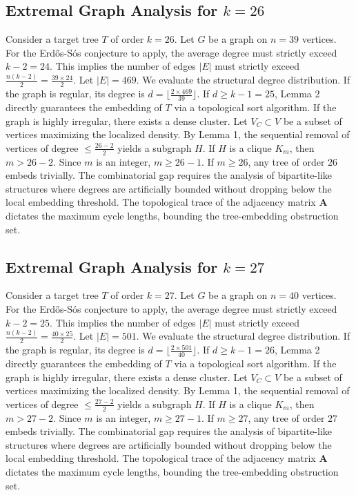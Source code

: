 \documentclass[11pt,a4paper]{article}
\begin{document}
\subsection{Extremal Graph Analysis for $k=26$}
Consider a target tree $T$ of order $k=26$.
Let $G$ be a graph on $n=39$ vertices.
For the Erd\H{o}s-S\'os conjecture to apply, the average degree must strictly exceed $k-2 = 24$.
This implies the number of edges $|E|$ must strictly exceed $\frac{n(k-2)}{2} = \frac{39 \times 24}{2}$.
Let $|E| = 469$.
We evaluate the structural degree distribution. If the graph is regular, its degree is $d = \lfloor \frac{2 \times 469}{39} \rfloor$.
If $d \geq k-1 = 25$, Lemma 2 directly guarantees the embedding of $T$ via a topological sort algorithm.
If the graph is highly irregular, there exists a dense cluster. Let $V_C \subset V$ be a subset of vertices maximizing the localized density.
By Lemma 1, the sequential removal of vertices of degree $\leq \frac{26-2}{2}$ yields a subgraph $H$.
If $H$ is a clique $K_{m}$, then $m > 26-2$. Since $m$ is an integer, $m \geq 26-1$. If $m \geq 26$, any tree of order $26$ embeds trivially.
The combinatorial gap requires the analysis of bipartite-like structures where degrees are artificially bounded without dropping below the local embedding threshold. The topological trace of the adjacency matrix $\mathbf{A}$ dictates the maximum cycle lengths, bounding the tree-embedding obstruction set.


\subsection{Extremal Graph Analysis for $k=27$}
Consider a target tree $T$ of order $k=27$.
Let $G$ be a graph on $n=40$ vertices.
For the Erd\H{o}s-S\'os conjecture to apply, the average degree must strictly exceed $k-2 = 25$.
This implies the number of edges $|E|$ must strictly exceed $\frac{n(k-2)}{2} = \frac{40 \times 25}{2}$.
Let $|E| = 501$.
We evaluate the structural degree distribution. If the graph is regular, its degree is $d = \lfloor \frac{2 \times 501}{40} \rfloor$.
If $d \geq k-1 = 26$, Lemma 2 directly guarantees the embedding of $T$ via a topological sort algorithm.
If the graph is highly irregular, there exists a dense cluster. Let $V_C \subset V$ be a subset of vertices maximizing the localized density.
By Lemma 1, the sequential removal of vertices of degree $\leq \frac{27-2}{2}$ yields a subgraph $H$.
If $H$ is a clique $K_{m}$, then $m > 27-2$. Since $m$ is an integer, $m \geq 27-1$. If $m \geq 27$, any tree of order $27$ embeds trivially.
The combinatorial gap requires the analysis of bipartite-like structures where degrees are artificially bounded without dropping below the local embedding threshold. The topological trace of the adjacency matrix $\mathbf{A}$ dictates the maximum cycle lengths, bounding the tree-embedding obstruction set.
\end{document}
